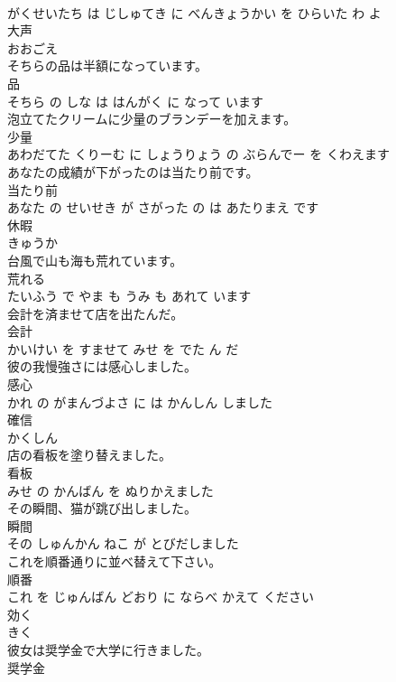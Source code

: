 \documentclass[8pt]{extreport}
\begin{document}
\begin{CJK}{UTF8}{min}
\\	がくせいたち は じしゅてき に べんきょうかい を ひらいた わ よ			
\\	大声	
\\	おおごえ		
\\	そちらの品は半額になっています。	
\\	品 
\\	そちら の しな は はんがく に なって います			
\\	泡立てたクリームに少量のブランデーを加えます。	
\\	少量 
\\	あわだてた くりーむ に しょうりょう の ぶらんでー を くわえます			
\\	あなたの成績が下がったのは当たり前です。	
\\	当たり前 
\\	あなた の せいせき が さがった の は あたりまえ です			
\\	休暇	
\\	きゅうか		
\\	台風で山も海も荒れています。	
\\	荒れる 
\\	たいふう で やま も うみ も あれて います			
\\	会計を済ませて店を出たんだ。	
\\	会計 
\\	かいけい を すませて みせ を でた ん だ			
\\	彼の我慢強さには感心しました。	
\\	感心 
\\	かれ の がまんづよさ に は かんしん しました			
\\	確信	
\\	かくしん		
\\	店の看板を塗り替えました。	
\\	看板 
\\	みせ の かんばん を ぬりかえました			
\\	その瞬間、猫が跳び出しました。	
\\	瞬間 
\\	その しゅんかん ねこ が とびだしました			
\\	これを順番通りに並べ替えて下さい。	
\\	順番 
\\	これ を じゅんばん どおり に ならべ かえて ください			
\\	効く	
\\	きく		
\\	彼女は奨学金で大学に行きました。	
\\	奨学金 

\end{CJK}
\end{document}
